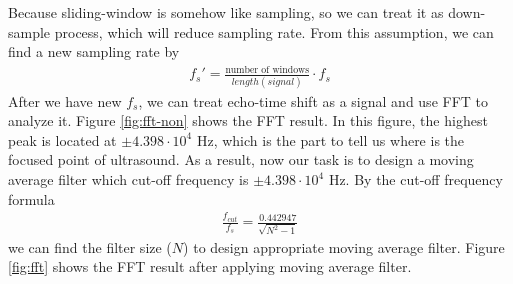 \documentclass{article}
\begin{document}
Because sliding-window is somehow like sampling, so we can treat it as down-sample process, which will reduce sampling rate.
From this assumption, we can find a new sampling rate by
\begin{align*}
    f_s' = \frac{\text{number of windows}}{length(signal)} \cdot f_s
\end{align*}
After we have new $f_s$, we can treat echo-time shift as a signal and use FFT to analyze it. Figure \ref{fig:fft-non} shows the
FFT result. In this figure, the highest peak is located at $\pm 4.398 \cdot 10^4$ Hz, which is the part to tell us where
is the focused point of ultrasound. As a result, now our task is to design a moving average filter which cut-off frequency
is $\pm 4.398 \cdot 10^4$ Hz. By the cut-off frequency formula
\begin{align*}
    \frac{f_{cut}}{f_s} = \frac{0.442947}{\sqrt{N^2 - 1}}
\end{align*}
we can find the filter size ($N$) to design appropriate moving average filter. Figure \ref{fig:fft} shows the FFT
result after applying moving average filter.
\end{document}
